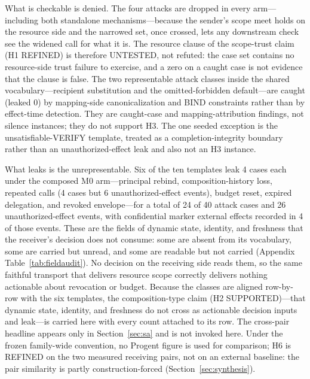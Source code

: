 \documentclass[sigconf,anonymous,nonacm]{acmart}
\newcommand{\code}[1]{\texttt{\detokenize{#1}}}
\newcommand{\status}[1]{\textsc{#1}}
\begin{document}
What is checkable is denied. The four \code{resource_widen} attacks are dropped in every arm---including both standalone mechanisms---because the sender's scope meet holds on the resource side and the narrowed set, once crossed, lets any downstream check see the widened call for what it is. The resource clause of the scope-trust claim (H1 \status{REFINED}) is therefore \status{UNTESTED}, not refuted: the case set contains no resource-side trust failure to exercise, and a zero on a caught case is not evidence that the clause is false. The two representable attack classes inside the shared vocabulary---recipient substitution and the omitted-forbidden default---are caught (leaked 0) by mapping-side canonicalization and BIND constraints rather than by effect-time detection. They are caught-case and mapping-attribution findings, not silence instances; they do not support H3. The one seeded exception is the unsatisfiable-VERIFY template, treated as a completion-integrity boundary rather than an unauthorized-effect leak and also not an H3 instance.

What leaks is the unrepresentable. Six of the ten templates leak 4 cases each under the composed M0 arm---principal rebind, composition-history loss, repeated calls (4 cases but 6 unauthorized-effect events), budget reset, expired delegation, and revoked envelope---for a total of 24 of 40 attack cases and 26 unauthorized-effect events, with confidential marker external effects recorded in 4 of those events. These are the fields of dynamic state, identity, and freshness that the receiver's decision does not consume: some are absent from its vocabulary, some are carried but unread, and some are readable but not carried (Appendix Table~\ref{tab:fieldaudit}). No decision on the receiving side reads them, so the same faithful transport that delivers resource scope correctly delivers nothing actionable about revocation or budget. Because the classes are aligned row-by-row with the six templates, the composition-type claim (H2 \status{SUPPORTED})---that dynamic state, identity, and freshness do not cross as actionable decision inputs and leak---is carried here with every count attached to its row. The cross-pair headline appears only in Section~\ref{sec:sa} and is not invoked here. Under the frozen family-wide convention, no Progent figure is used for comparison; H6 is \status{REFINED} on the two measured receiving pairs, not on an external baseline: the pair similarity is partly construction-forced (Section~\ref{sec:synthesis}).
\end{document}
